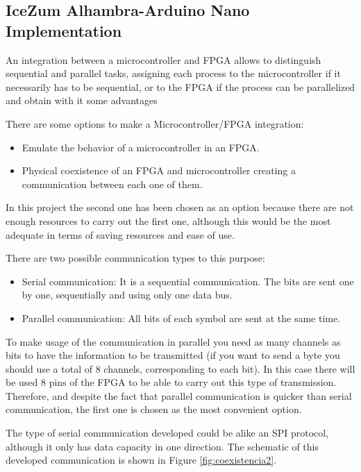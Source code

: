 \subsection{IceZum Alhambra-Arduino Nano Implementation}\label{sec:Integracion}

An integration between a microcontroller and FPGA allows to distinguish sequential and parallel tasks, assigning each process to the microcontroller if it necessarily has to be sequential, or to the FPGA if the process can be parallelized and obtain with it some advantages\newline

There are some options to make a Microcontroller/FPGA integration:

\begin{itemize}
	\item Emulate the behavior of a microcontroller in an FPGA.
	\item Physical coexistence of an FPGA and microcontroller creating a communication between each one of them.
\end{itemize}
In this project the second one has been chosen as an option because there are not enough resources to carry out the first one, although this would be the most adequate in terms of saving resources and ease of use. \newline

There are two possible communication types to this purpose:
\begin{itemize}
	\item Serial communication: It is a sequential communication. The bits are sent one by one, sequentially and using only one data bus.
	\item Parallel communication: All bits of each symbol are sent at the same time.
\end{itemize} 

To make usage of the communication in parallel you need as many channels as bits to have the information to be transmitted (if you want to send a byte you should use a total of 8 channels, corresponding to each bit). In this case there will be used 8 pins of the FPGA to be able to carry out this type of transmission. Therefore, and despite the fact that parallel communication is quicker than serial communication, the first one is chosen as the most convenient option. \newline

The type of serial communication developed could be alike an SPI protocol, although it only has data capacity in one direction. The schematic of this developed communication is shown in Figure \ref{fig:coexistencia2}.


